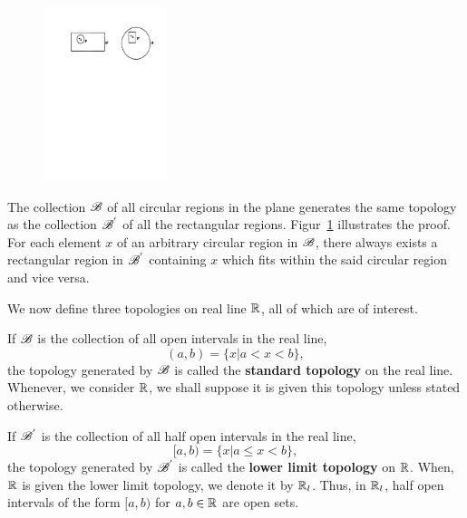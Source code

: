 \documentclass[a4paper,english,12pt]{article}
\begin{document}
\begin{figure}[hhhh]
\centering
 \includegraphics[height=2.0in]{Figures/BasisCompare.pdf}
	\caption{}
 \label{Fig:CompareBasis}
\end{figure}
\begin{exmp}
The collection $\mathscr{B}$ of all circular regions in the plane generates the same topology as the collection $\mathscr{B}^{'}$ of all the rectangular regions. Figur~\ref{Fig:CompareBasis} illustrates the proof. For each element $x$ of an arbitrary circular region in $\mathscr{B}$, there always exists a rectangular region in $\mathscr{B}^{'}$ containing $x$ which fits within the said circular region and vice versa. 
\end{exmp}

We now define three topologies on real line $\mathbb{R}$, all of which are of interest.

\begin{defn}
If $\mathscr{B}$ is the collection of all open intervals in the real line, 
\begin{equation}
 (a, b) = \{ x | a < x < b\} \nonumber,
\end{equation}
the topology generated by $\mathscr{B}$ is called the \textbf{standard topology} on the real line. Whenever, we consider $\mathbb{R}$, we shall suppose it is given this topology 
unless stated otherwise.
\end{defn}

\begin{defn}
If $\mathscr{B}^{'}$ is the collection of all half open intervals in the real line, 
\begin{equation}
 [a, b) = \{ x | a \leq x < b\} \nonumber,
\end{equation}
the topology generated by $\mathscr{B}^{'}$ is called the \textbf{lower limit topology} on $\mathbb{R}$. When, $\mathbb{R}$ is given the lower limit topology, we denote it by 
$\mathbb{R}_{l}$. Thus, in $\mathbb{R}_{l}$, half open intervals of the form $[a, b)$ for $a, b \in \mathbb{R}$ are open sets.
\end{defn}
\end{document}
